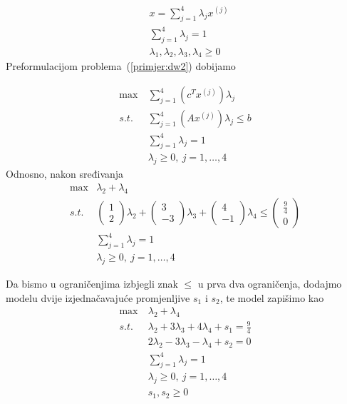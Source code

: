 \documentclass[a4paper, utf8, 11pt, colorlinks]{book}
\begin{document}
$$\begin{aligned}
&x = \sum_{j=1}^4\lambda_j x^{(j)}\\
&\sum_{j=1}^4\lambda_j=1\\
&\lambda_1,\lambda_2,\lambda_3,\lambda_4\geqslant 0
\end{aligned}$$
 Preformulacijom problema~(\ref{primjer:dw2}) dobijamo
 
     \begin{equation}
 	\begin{aligned}\label{primjer:dw3}
 		\max\  & \sum_{j=1}^4(c^T  x^{(j)})\lambda_j\\
 		s.t.\  &\sum_{j=1}^4 (A  x^{(j)})\lambda_j\leqslant b\\
 		&\sum_{j=1}^4\lambda_j = 1\\
 		&\lambda_j\geqslant 0,\ j = 1,\ldots,4
 	\end{aligned}
 \end{equation}
 Odnosno, nakon sređivanja 
      \begin{equation}
 	\begin{aligned}\label{primjer:dw4}
 		\max  & \lambda_2+\lambda_4\\
 		s.t.\  &\left(\begin{array}{c}
 			1\\
 			2
 		\end{array}\right)\lambda_2+\left(\begin{array}{c}
 		3\\
 		-3
 	\end{array}\right)\lambda_3+\left(\begin{array}{c}
 	4\\
 	-1
 \end{array}\right)\lambda_4\leqslant \left(\begin{array}{c}
 			\frac 9 4\\
 			0
 		\end{array}\right)\\
 		&\sum_{j=1}^4\lambda_j = 1\\
 		&\lambda_j\geqslant 0,\ j = 1,\ldots,4
 	\end{aligned}
 \end{equation}

Da bismo u ograničenjima izbjegli znak $\leqslant$ u prva dva ograničenja, dodajmo modelu dvije izjednačavajuće promjenljive $s_1$ i $s_2$, te model zapišimo kao
      \begin{equation}
	\begin{aligned}\label{primjer:dw5}
		\max\  & \lambda_2+\lambda_4\\
		s.t.\  &\lambda_2+3\lambda_3+4\lambda_4+s_1=\frac 94\\
		&2\lambda_2-3\lambda_3-\lambda_4+s_2=0\\
		&\sum_{j=1}^4\lambda_j = 1\\
		&\lambda_j\geqslant 0,\ j = 1,\ldots,4\\
		&s_1,s_2\geqslant 0
	\end{aligned}
\end{equation}
\end{document}
